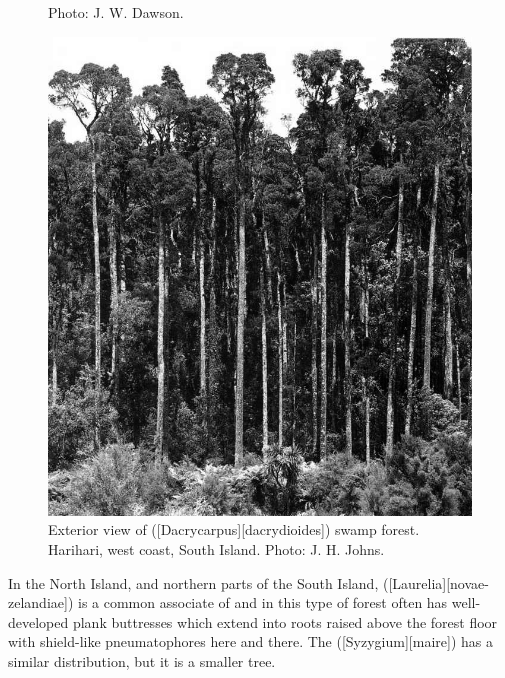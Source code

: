 \begin{figure}[t]
\begin{minipage}[t]{\textwidth}
\begin{minipage}[t]{(\textwidth-\fgap) * \real{0.395}}
{			Photo: J. W. Dawson.}%
			\label{fig:66cabbagetree}
		\end{minipage}\hspace{\fgap}%
		\begin{minipage}[t]{(\textwidth-\fgap) * \real{0.605}}
			\centering
			\includegraphics[width=\textwidth]{graphics/figure67kahikatea.jpg}
			\caption[Exterior view of kahikatea swamp forest]{Exterior view of  ([Dacrycarpus][dacrydioides]) swamp forest.
			Harihari, west coast, South Island.
			Photo: J. H. Johns.}%
			\label{fig:67kahikatea}
		\end{minipage}
	\end{minipage}
\end{figure}
In the North Island, and northern parts of the South Island,  ([Laurelia][novae-zelandiae]) is a common associate of  and in this type of forest often has well-developed plank buttresses which extend into roots raised above the forest floor with shield-like pneumatophores here and there.
The  ([Syzygium][maire]) has a similar distribution, but it is a smaller tree.

